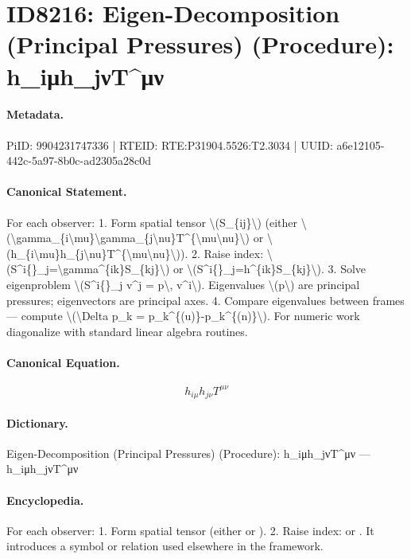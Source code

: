 \section*{ID8216: Eigen-Decomposition (Principal Pressures) (Procedure): h\_iμh\_jνT\textasciicircum{}μν}
\paragraph{Metadata.}
PiID: 9904231747336 | RTEID: RTE:P31904.5526:T2.3034 | UUID: a6e12105-442c-5a97-8b0c-ad2305a28c0d

\paragraph{Canonical Statement.}
For each observer: 1. Form spatial tensor \textbackslash{}(S\_\{ij\}\textbackslash{}) (either \textbackslash{}(\textbackslash{}gamma\_\{i\textbackslash{}mu\}\textbackslash{}gamma\_\{j\textbackslash{}nu\}T\textasciicircum{}\{\textbackslash{}mu\textbackslash{}nu\}\textbackslash{}) or \textbackslash{}(h\_\{i\textbackslash{}mu\}h\_\{j\textbackslash{}nu\}T\textasciicircum{}\{\textbackslash{}mu\textbackslash{}nu\}\textbackslash{})). 2. Raise index: \textbackslash{}(S\textasciicircum{}i\{\}\_j=\textbackslash{}gamma\textasciicircum{}\{ik\}S\_\{kj\}\textbackslash{}) or \textbackslash{}(S\textasciicircum{}i\{\}\_j=h\textasciicircum{}\{ik\}S\_\{kj\}\textbackslash{}). 3. Solve eigenproblem \textbackslash{}(S\textasciicircum{}i\{\}\_j v\textasciicircum{}j = p\textbackslash{}, v\textasciicircum{}i\textbackslash{}). Eigenvalues \textbackslash{}(p\textbackslash{}) are principal pressures; eigenvectors are principal axes. 4. Compare eigenvalues between frames — compute \textbackslash{}(\textbackslash{}Delta p\_k = p\_k\textasciicircum{}\{(u)\}-p\_k\textasciicircum{}\{(n)\}\textbackslash{}). For numeric work diagonalize with standard linear algebra routines.

\paragraph{Canonical Equation.}
\[
h_{i\mu}h_{j\nu}T^{\mu\nu}
\]

\paragraph{Dictionary.}
Eigen-Decomposition (Principal Pressures) (Procedure): h\_iμh\_jνT\textasciicircum{}μν — h\_iμh\_jνT\textasciicircum{}μν

\paragraph{Encyclopedia.}
For each observer: 1. Form spatial tensor (either or ). 2. Raise index: or . It introduces a symbol or relation used elsewhere in the framework.
